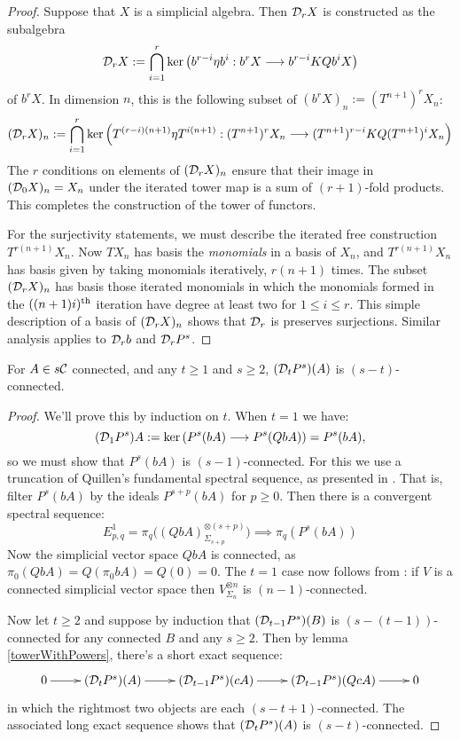 \documentclass[11pt]{amsart}
\theoremstyle{plain}
\newcommand{\Comm}{\calC}
\newcommand{\caldup}[1]{\calD_{\smash{#1}}}
\begin{document}
\begin{proof}

Suppose that $X$ is a simplicial algebra. Then $\caldup{r}X$
is constructed as the subalgebra
\[\caldup{r}X:= \bigcap_{i=1}^{r}\ker\!\left(b^{r-i}\eta b^{i}:b^{r}X\to b^{r-i}KQb^{i}X\right)\]
of $b^rX$. In dimension $n$, this is the following subset of $(b^rX)_n:=(T^{n+1})^rX_n$:
\[(\caldup{r}X)_n:=\bigcap_{i=1}^{r}\ker\!\left(T^{(r-i)(n+1)}\eta T^{i(n+1)}:(T^{n+1})^rX_n\to (T^{n+1})^{r-i}KQ(T^{n+1})^iX_n\right)\]
The $r$ conditions on elements of $(\caldup{r}X)_n$ ensure that their image in $(\caldup{0}X)_n=X_n$ under the iterated tower map is a sum of $(r+1)$-fold products. This completes the construction of the tower of functors.

For the surjectivity statements, we must describe the iterated free construction $T^{r(n+1)}X_n$. Now $TX_n$ has basis the \emph{monomials} in a basis of $X_n$, and $T^{r(n+1)}X_n$ has basis given by taking monomials iteratively, $r(n+1)$ times. The subset $(\caldup{r}X)_n$ has basis those iterated monomials in which the monomials formed in the $((n+1)i)^\textup{th}$ iteration have degree at least two for $1\leq i\leq r$. This simple description of a basis of $(\caldup{r}X)_n$ shows that $\caldup{r}$ is preserves surjections. Similar analysis applies to $\caldup{r}b$ and $\caldup{r}P^s$.
\end{proof}
\begin{lem}\label{connectivityOfDerivedPowers}
For $A\in s\Comm$ connected, and any $t\geq1$ and $s\geq2$, $(\caldup{t}P^{s})(A)$ is $(s-t)$-connected.
\end{lem}
\begin{proof}
We'll prove this by induction on $t$. When $t=1$ we have:
\[(\caldup{1}P^{s})A:=\ker(P^{s}(bA)\to P^{s}(QbA))=P^{s}(bA),\]
so we must show that $P^s(bA)$ is $(s-1)$-connected. For this we use a truncation of Quillen's fundamental spectral sequence, as presented in \cite[thm 6.2]{MR1089001}. That is, filter $P^s(bA)$ by the ideals $P^{s+p}(bA)$ for $p\geq0$. Then there is a convergent spectral sequence:
\[E^1_{p,q}= \pi_q\bigl((QbA)^{\otimes (s+p)}_{\Sigma_{s+p}}\bigr)\implies \pi_q(P^s(bA))\]
Now the simplicial vector space $QbA$ is connected, as $\pi_0(QbA)=Q(\pi_0bA)=Q(0)=0$. The $t=1$ case now follows from \cite[Satz 12.1]{DoldPuppeSuspension.pdf}: if $V$ is a connected simplicial vector space then $V^{\otimes n}_{\Sigma_n}$ is $(n-1)$-connected. 

Now let $t\geq2$ and suppose by induction that $(\caldup{t-1}P^{s})(B)$ is $(s-(t-1))$-connected for any connected $B$ and any $s\geq2$. Then by lemma \ref{towerWithPowers}, there's a short exact sequence:
\[\xymatrix{
0\ar[r]&
(\caldup{t}P^{s})(A)\ar[r]&
(\caldup{t-1}P^{s})(cA)\ar[r]&
(\caldup{t-1}P^{s})(QcA)\ar[r]&
0
}\]
in which the rightmost two objects are each $(s-t+1)$-connected. The associated long exact sequence shows that $(\caldup{t}P^{s})(A)$ is $(s-t)$-connected.
\end{proof}
\end{document}
